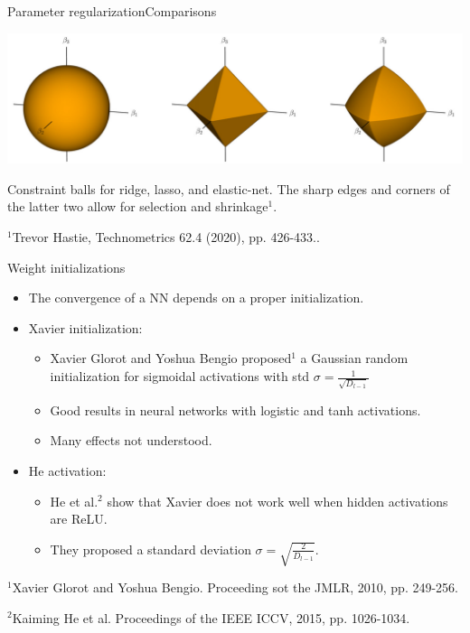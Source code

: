 \documentclass{beamer}
\begin{document}
\begin{frame}{Parameter regularization}{Comparisons}
\begin{center}
\includegraphics[scale=0.2]{Module 1 (NN)/pics/regularization_comparisons.png}
\end{center}
Constraint balls for ridge, lasso, and elastic-net. The sharp edges and corners of the latter two allow for  selection and shrinkage$^1$.

\vspace{1cm}

$^1$\footnotesize{Trevor Hastie, Technometrics 62.4 (2020), pp. 426-433.}. 
\end{frame}
\begin{frame}{Weight initializations}
\begin{itemize}

\item The convergence of a NN depends on a proper initialization.  

\item Xavier initialization:
\begin{itemize}
    \item   Xavier Glorot and Yoshua Bengio proposed$^1$ a Gaussian random initialization for sigmoidal activations with std  $\sigma =\frac{1}{\sqrt{D_{l-1}}}$
    \item Good results in neural networks with logistic and tanh activations.
    \item Many effects not understood. 
\end{itemize}  
\item He activation:
\begin{itemize}
\item He et al.$^2$ show that Xavier does not work well when hidden activations are ReLU. 
\item They proposed a standard deviation $\sigma =\sqrt{\frac{2}{{D_{l-1}}}}$. 
\end{itemize}
\end{itemize}
$^1$\footnotesize{Xavier Glorot and Yoshua Bengio. Proceeding sot the JMLR, 2010, pp. 249-256.}



$^2$\footnotesize{Kaiming He et al.  Proceedings of the IEEE ICCV, 2015, pp. 1026-1034.}

\end{frame}
\end{document}

